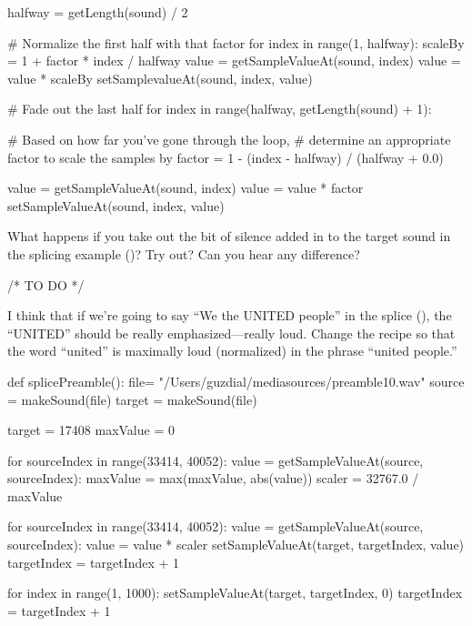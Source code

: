 \begin{exercises}
\begin{ex}
\begin{example}
    halfway = getLength(sound) / 2

    # Normalize the first half with that factor
    for index in range(1, halfway):
        scaleBy = 1 + factor * index / halfway
        value = getSampleValueAt(sound, index)
        value = value * scaleBy
        setSamplevalueAt(sound, index, value)

    # Fade out the last half
    for index in range(halfway, getLength(sound) + 1):

        # Based on how far you've gone through the loop, 
        # determine an appropriate factor to scale the samples by
        factor = 1 - (index - halfway) / (halfway + 0.0)

        value = getSampleValueAt(sound, index)
        value = value * factor
        setSampleValueAt(sound, index, value)
\end{example}
\end{ex}

\begin{ex}
What happens if you take out the bit of silence added in to the
target sound in the splicing example ()?  Try
out? Can you hear any difference?

/* TO DO */
\end{ex}


\begin{ex}
I think that if we're going to say ``We the UNITED people'' in the
splice (), the ``UNITED'' should be really
emphasized---really loud.  Change the recipe so that the word
``united'' is maximally loud (normalized) in the phrase ``united
people.''

\begin{example}
def splicePreamble():
  file= "/Users/guzdial/mediasources/preamble10.wav"
  source = makeSound(file)
  target = makeSound(file)
	
  target = 17408
  maxValue = 0

  for sourceIndex in range(33414, 40052):
    value = getSampleValueAt(source, sourceIndex):
    maxValue = max(maxValue, abs(value))
  scaler = 32767.0 / maxValue

  for sourceIndex in range(33414, 40052):
    value = getSampleValueAt(source, sourceIndex):
    value = value * scaler
    setSampleValueAt(target, targetIndex, value)
    targetIndex = targetIndex + 1
	
  for index in range(1, 1000):
    setSampleValueAt(target, targetIndex, 0)
    targetIndex = targetIndex + 1


\end{example}
\end{ex}
\end{exercises}
